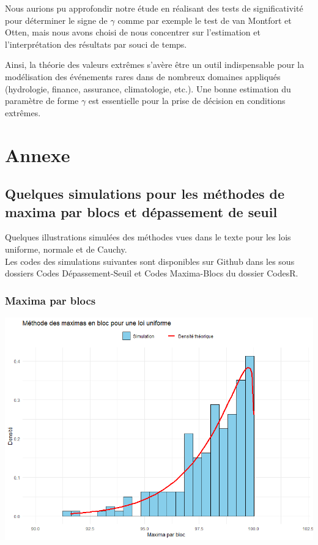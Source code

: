 \documentclass{article}
\theoremstyle{plain}
\theoremstyle{definition}
\theoremstyle{plain}
\begin{document}
\medskip

Nous aurions pu approfondir notre étude en réalisant des tests de significativité pour déterminer le signe de $\gamma$ comme par exemple le test de van Montfort et Otten, mais nous avons choisi de nous concentrer sur l'estimation et l'interprétation des résultats par souci de temps.

\medskip

Ainsi, la théorie des valeurs extrêmes s’avère être un outil indispensable pour la modélisation des événements rares dans de nombreux domaines appliqués (hydrologie, finance, assurance, climatologie, etc.). Une bonne estimation du paramètre de forme $\gamma$ est essentielle pour la prise de décision en conditions extrêmes.


\newpage
\section{Annexe}
\subsection{Quelques simulations pour les méthodes de maxima par blocs et dépassement de seuil}

\noindent Quelques illustrations simulées des méthodes vues dans le texte pour les lois uniforme, normale et de Cauchy. \\
\noindent Les codes des simulations suivantes sont disponibles sur Github dans les sous dossiers Codes Dépassement-Seuil et Codes Maxima-Blocs du dossier CodesR.

\subsubsection{Maxima par blocs}

\begin{center}
	\includegraphics[scale=0.60]{./images/MB_Uniforme} 
\end{center}
\end{document}
